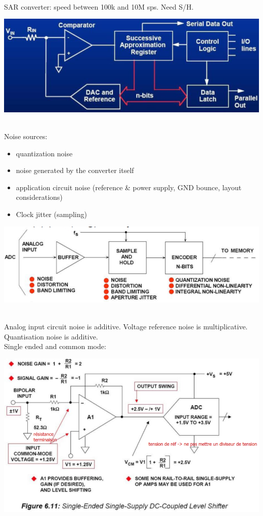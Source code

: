 \documentclass[resume]{subfiles}
\begin{document}
\begin{multicols}{3}
\begin{minipage}{\linewidth}
\end{minipage}\\
SAR converter: speed between 100k and 10M sps. Need S/H.\\
\begin{minipage}{\linewidth}
	\centering
    \includegraphics[width =0.7\columnwidth]{an12.png}
\end{minipage}\\
Noise sources:\\
\begin{itemize}
	\item quantization noise
	\item noise generated by the converter itself
	\item application circuit noise (reference \& power supply, GND bounce, layout considerations)
	\item Clock jitter (sampling)
\end{itemize}
\begin{minipage}{\linewidth}
	\centering
    \includegraphics[width =0.7\columnwidth]{an13.png}
\end{minipage}\\
Analog input circuit noise is additive. Voltage reference noise is multiplicative. Quantisation noise is additive.\\
Single ended and common mode:\\
\begin{minipage}{\linewidth}
	\centering
    \includegraphics[width =0.7\columnwidth]{an14.png}

\end{minipage}
\end{multicols}
\end{document}
